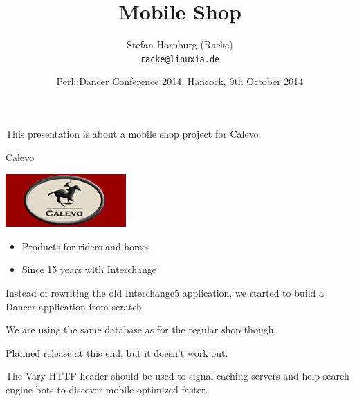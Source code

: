 \usepackage[utf8]{inputenc}
\usepackage[T1]{fontenc}
\usepackage{mathptmx}
\usepackage[scaled=.90]{helvet}
\usepackage{courier}
\usepackage{caption}
\captionsetup{labelformat=empty,labelsep=none}
\usepackage{verbatim}
\usepackage{hyperref}
\usepackage{listings}
\usepackage{ulem}
\lstset{language=Perl,basicstyle=\normalsize,tabsize=3,showstringspaces=false}

\title{Mobile Shop}
\author[racke]{Stefan Hornburg (Racke)\\  \texttt{racke@linuxia.de}}
\date{Perl::Dancer Conference 2014, Hancock, 9th October 2014}


\maketitle{}

\begin{frame}
  \titlepage
\end{frame}

\tableofcontents

This presentation is about a mobile shop project for Calevo.

\begin{frame}{Calevo}
\begin{center}
  \includegraphics{pics/calevo.jpg}
\end{center}
\begin{itemize}
\item Products for riders and horses
\item Since 15 years with Interchange 
\end{itemize}
\end{frame}

Instead of rewriting the old Interchange5 application, we started
to build a Dancer application from scratch.

We are using the same database as for the regular shop though.

Planned release at this end, but it doesn't work out.

The Vary HTTP header should be used to signal caching servers
and help search engine bots to discover mobile-optimized faster.

